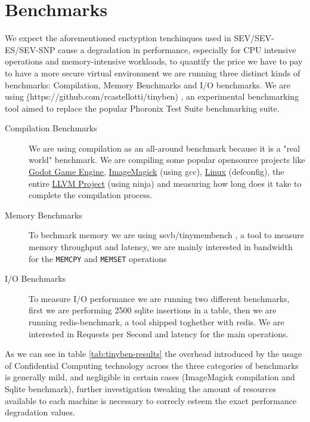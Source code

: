 \documentclass[twocolumn]{article}
\begin{document}
\section{Benchmarks}
    We expect the aforementioned enctyption tenchinques used in SEV/SEV-ES/SEV-SNP cause a degradation in performance, especially for CPU intensive operations and memory-intensive workloads, to quantify the price we have to pay to have a more secure virtual environment we are running three distinct kinds of benchmarks: Compilation, Memory Benchmarks and I/O benchmarks. We are using \href{rcastellotti/tinyben}(https://github.com/rcastellotti/tinyben) \cite{tinyben}, an experimental benchmarking tool aimed to replace the popular Phoronix Test Suite \cite{pts} benchmarking suite.

    \begin{description}
        \item[Compilation Benchmarks] We are using compilation as an all-around benchmark because it is a "real world" benchmark. We are compiling some popular opensource projects like \href{https://github.com/godotengine/godot}{Godot Game Engine}, \href{https://github.com/imagemagick/imagemagick}{ImageMagick} (using gcc), \href{https://git.kernel.org/pub/scm/linux/kernel/git/torvalds/linux.git}{Linux} (defconfig), the entire \href{https://github.com/llvm/llvm-project}{LLVM Project} (using ninja) and measuring how long does it take to complete the compilation process.
        \item[Memory Benchmarks] To bechmark memory we are using ssvb/tinymembench \cite{tinymembench}, a tool to measure memory throughput and latency, we are mainly interested in bandwidth for the \texttt{MEMCPY} and \texttt{MEMSET} operations
        \item[I/O Benchmarks] To measure I/O performance we are running two different benchmarks, first we are performing 2500 sqlite insertions in a table, then we are running redis-benchmark, a tool shipped toghether with redis. We are interested in Requests per Second and latency for the main operations. 
    \end{description}

    As we can see in table \ref{tab:tinyben-results} the overhead introduced by the usage of Confidential Computing technology across the three categories of benchmarks is generally mild, and negligible in certain cases (ImageMagick compilation and Sqlite benchmark), further investigation tweaking the amount of resources available to each machine is necessary to correcly esteem the exact performance degradation values.
\end{document}
